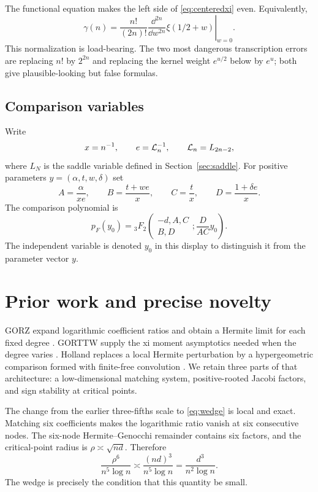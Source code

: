 \documentclass[12pt]{article}
\begin{document}
The functional equation makes the left side of \eqref{eq:centeredxi} even.
Equivalently,
\begin{equation}\label{eq:taylor-normalization}
 \gamma(n)=\frac{n!}{(2n)!}
 \left.\frac{\dd^{2n}}{\dd w^{2n}}\xi(1/2+w)\right|_{w=0}.
\end{equation}
This normalization is load-bearing.  The two most dangerous transcription
errors are replacing $n!$ by $2^{2n}$ and replacing the kernel weight
$e^{u/2}$ below by $e^u$; both give plausible-looking but false formulas.

\subsection{Comparison variables}

Write
\[
 x=n^{-1},\qquad e=\mathcal L_n^{-1},\qquad \mathcal L_n=L_{2n-2},
\]
where $L_N$ is the saddle variable defined in
Section~\ref{sec:saddle}.  For positive parameters
$y=(\alpha,t,w,\delta)$ set
\begin{equation}\label{eq:ABCD}
 A=\frac{\alpha}{xe},\qquad
 B=\frac{t+we}{x},\qquad
 C=\frac{t}{x},\qquad
 D=\frac{1+\delta e}{x}.
\end{equation}
The comparison polynomial is
\begin{equation}\label{eq:model-def}
 p_F(y_0)={}_3F_2\!\left(
 \begin{matrix}-d,A,C\\B,D\end{matrix};
 \frac{D}{AC}y_0\right).
\end{equation}
The independent variable is denoted $y_0$ in this display to distinguish it
from the parameter vector $y$.

\section{Prior work and precise novelty}\label{sec:prior}

GORZ expand logarithmic coefficient ratios and obtain a Hermite limit for
each fixed degree \cite{GORZ2019}.  GORTTW supply the xi moment asymptotics
needed when the degree varies \cite{GORTTW2020}.  Holland replaces a local
Hermite perturbation by a hypergeometric comparison formed with finite-free
convolution \cite{Holland2026}.  We retain three parts of that architecture:
a low-dimensional matching system, positive-rooted Jacobi factors, and sign
stability at critical points.

The change from the earlier three-fifths scale to \eqref{eq:wedge} is local
and exact.  Matching six coefficients makes the logarithmic ratio vanish at
six consecutive nodes.  The six-node Hermite--Genocchi remainder contains
six factors, and the critical-point radius is $\rho\asymp\sqrt{nd}$.
Therefore
\[
 \frac{\rho^6}{n^5\log n}
 \asymp \frac{(nd)^3}{n^5\log n}
 =\frac{d^3}{n^2\log n}.
\]
The wedge is precisely the condition that this quantity be small.
\end{document}
